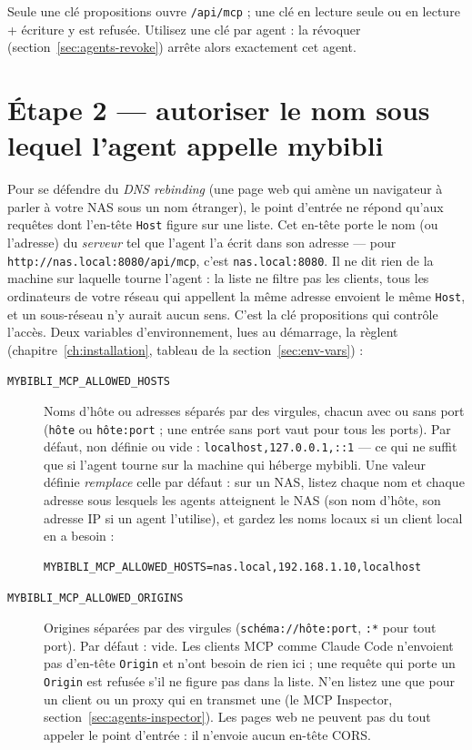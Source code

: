 Seule une clé propositions ouvre \texttt{/api/mcp} ; une clé en
lecture seule ou en lecture + écriture y est refusée. Utilisez une clé
par agent : la révoquer (section~\ref{sec:agents-revoke}) arrête alors
exactement cet agent.

\section{Étape 2 --- autoriser le nom sous lequel l'agent appelle mybibli}
\label{sec:agents-hosts}

Pour se défendre du \emph{DNS rebinding} (une page web qui amène un
navigateur à parler à votre NAS sous un nom étranger), le point
d'entrée ne répond qu'aux requêtes dont l'en-tête \texttt{Host}
figure sur une liste. Cet en-tête porte le nom (ou l'adresse) du
\emph{serveur} tel que l'agent l'a écrit dans son adresse --- pour
\texttt{http://nas.local:8080/api/mcp}, c'est
\texttt{nas.local:8080}. Il ne dit rien de la machine sur laquelle
tourne l'agent : la liste ne filtre pas les clients, tous les
ordinateurs de votre réseau qui appellent la même adresse envoient le
même \texttt{Host}, et un sous-réseau n'y aurait aucun sens. C'est la
clé propositions qui contrôle l'accès. Deux variables d'environnement, lues au
démarrage, la règlent (chapitre~\ref{ch:installation}, tableau de la
section~\ref{sec:env-vars}) :

\begin{description}
  \item[\texttt{MYBIBLI\_MCP\_ALLOWED\_HOSTS}]
        Noms d'hôte ou adresses séparés par des virgules, chacun avec
        ou sans port (\texttt{hôte} ou \texttt{hôte:port} ; une
        entrée sans port vaut pour tous les ports). Par défaut, non
        définie ou vide : \texttt{localhost,127.0.0.1,::1} --- ce qui
        ne suffit que si l'agent tourne sur la machine qui héberge
        mybibli. Une valeur définie \emph{remplace} celle par
        défaut : sur un NAS, listez chaque nom et chaque adresse sous
        lesquels les agents atteignent le NAS (son nom d'hôte, son
        adresse IP si un agent l'utilise), et gardez les noms locaux
        si un client local en a besoin :
\begin{lstlisting}
MYBIBLI_MCP_ALLOWED_HOSTS=nas.local,192.168.1.10,localhost
\end{lstlisting}
  \item[\texttt{MYBIBLI\_MCP\_ALLOWED\_ORIGINS}]
        Origines séparées par des virgules (\texttt{schéma://hôte:port},
        \texttt{:*} pour tout port). Par défaut : vide. Les clients
        MCP comme Claude Code n'envoient pas d'en-tête
        \texttt{Origin} et n'ont besoin de rien ici ; une requête qui
        porte un \texttt{Origin} est refusée s'il ne figure pas dans
        la liste. N'en listez une que pour un client ou un proxy qui
        en transmet une (le MCP Inspector,
        section~\ref{sec:agents-inspector}). Les pages web ne peuvent
        pas du tout appeler le point d'entrée : il n'envoie aucun
        en-tête CORS.
\end{description}

